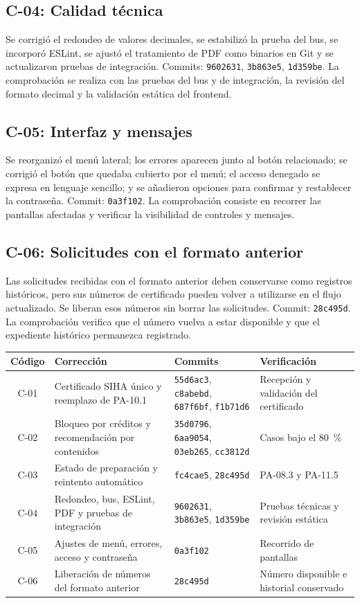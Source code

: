 \subsection{C-04: Calidad técnica}
Se corrigió el redondeo de valores decimales, se estabilizó la prueba del bus, se incorporó ESLint, se ajustó el tratamiento de PDF como binarios en Git y se actualizaron pruebas de integración. Commits: \texttt{9602631}, \texttt{3b863e5}, \texttt{1d359be}. La comprobación se realiza con las pruebas del bus y de integración, la revisión del formato decimal y la validación estática del frontend.

\subsection{C-05: Interfaz y mensajes}
Se reorganizó el menú lateral; los errores aparecen junto al botón relacionado; se corrigió el botón que quedaba cubierto por el menú; el acceso denegado se expresa en lenguaje sencillo; y se añadieron opciones para confirmar y restablecer la contraseña. Commit: \texttt{0a3f102}. La comprobación consiste en recorrer las pantallas afectadas y verificar la visibilidad de controles y mensajes.

\subsection{C-06: Solicitudes con el formato anterior}
Las solicitudes recibidas con el formato anterior deben conservarse como registros históricos, pero sus números de certificado pueden volver a utilizarse en el flujo actualizado. Se liberan esos números sin borrar las solicitudes. Commit: \texttt{28c495d}. La comprobación verifica que el número vuelva a estar disponible y que el expediente histórico permanezca registrado.

\begin{tabularx}{\textwidth}{|c|X|X|X|}\hline
\rowcolor{grisTarjeta}\textbf{Código} & \textbf{Corrección} & \textbf{Commits} & \textbf{Verificación}\\\hline
C-01 & Certificado SIHA único y reemplazo de PA-10.1 & \texttt{55d6ac3}, \texttt{c8abebd}, \texttt{687f6bf}, \texttt{f1b71d6} & Recepción y validación del certificado\\\hline
C-02 & Bloqueo por créditos y recomendación por contenidos & \texttt{35d0796}, \texttt{6aa9054}, \texttt{03eb265}, \texttt{cc3812d} & Casos bajo el 80~\%\\\hline
C-03 & Estado de preparación y reintento automático & \texttt{fc4cae5}, \texttt{28c495d} & PA-08.3 y PA-11.5\\\hline
C-04 & Redondeo, bus, ESLint, PDF y pruebas de integración & \texttt{9602631}, \texttt{3b863e5}, \texttt{1d359be} & Pruebas técnicas y revisión estática\\\hline
C-05 & Ajustes de menú, errores, acceso y contraseña & \texttt{0a3f102} & Recorrido de pantallas\\\hline
C-06 & Liberación de números del formato anterior & \texttt{28c495d} & Número disponible e historial conservado\\\hline
\end{tabularx}
